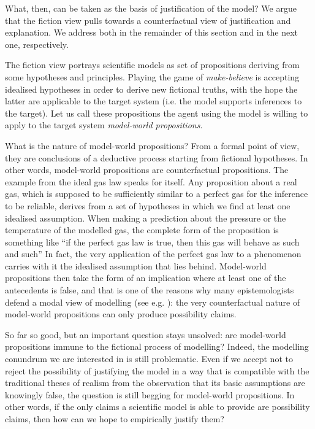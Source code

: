 \documentclass[a4paper,11pt]{article}
\theoremstyle{definition}
\begin{document}
What, then, can be taken as the basis of justification of the model?  We argue that the fiction view pulls towards a counterfactual view of justification and explanation. We address both in the remainder of this section and in the next one, respectively.

The fiction view portrays scientific models as set of propositions deriving from some hypotheses and principles. Playing the game of \textit{make-believe} is accepting idealised hypotheses in order to derive new fictional truths, with the hope the latter are applicable to the target system (i.e. the model supports inferences to the target). Let us call these propositions the agent using the model is willing to apply to the target system \textit{model-world propositions}.

What is the nature of model-world propositions? From a formal point of view, they are conclusions of a deductive process starting from fictional hypotheses. In other words, model-world propositions are counterfactual propositions. The example from the ideal gas law speaks for itself. Any proposition about a real gas, which is supposed to be sufficiently similar to a perfect gas for the inference to be reliable, derives from a set of hypotheses in which we find at least one idealised assumption. When making a prediction about the pressure or the temperature of the modelled gas, the complete form of the proposition is something like ``if the perfect gas law is true, then this gas will behave as such and such'' In fact, the very application of the perfect gas law to a phenomenon carries with it the idealised assumption that lies behind. Model-world propositions then take the form of an implication where at least one of the antecedents is false, and that is one of the reasons why many epistemologists defend a modal view of modelling (see e.g. \citep{VerreaultJulien2019}): the very counterfactual nature of model-world propositions can only produce possibility claims.

So far so good, but an important question stays unsolved: are model-world propositions immune to the fictional process of modelling? Indeed, the modelling conundrum we are interested in is still problematic. Even if we accept not to reject the possibility of justifying the model in a way that is compatible with the traditional theses of realism from the observation that its basic assumptions are knowingly false, the question is still begging for model-world propositions. In other words, if the only claims a scientific model is able to provide are possibility claims, then how can we hope to empirically justify them?
\end{document}
